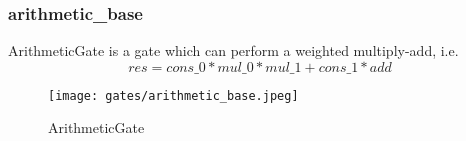 \subsubsection{arithmetic\_base}

ArithmeticGate is a gate which can perform a weighted multiply-add, i.e.
\[res = cons\_0 * mul\_0 * mul\_1 + cons\_1 * add\]



\begin{figure}[!h]
    \centering
    \texttt{[image: gates/arithmetic\_base.jpeg]}
    \caption{ArithmeticGate}
    \label{fig:arthmetic-gate}
\end{figure}